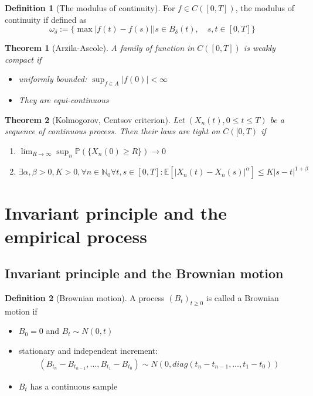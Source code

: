\documentclass[a4paper,11pt]{book}
\newtheorem{theorem}{Theorem}[section]
\theoremstyle{definition}
\newtheorem{definition}{Definition}[section]
\theoremstyle{remark}
\begin{document}
\begin{definition}[The modulus of continuity]
	For $f \in C([0, T])$, the modulus of continuity if defined as 
	\begin{equation*}
		\omega_\delta := \{ \max |f(t) - f(s)| | s \in B_\delta(t),\quad s,t \in [0, T]\}
	\end{equation*}
\end{definition}

\begin{theorem}[Arzila-Ascole] 
	A family of function in $C([0, T])$ is weakly compact if
	\begin{itemize}
		\item uniformly bounded: $\sup_{f \in A} |f(0)| < \infty$
		\item They are equi-continuous
	\end{itemize}
\end{theorem}

\begin{theorem}[Kolmogorov, Centsov criterion]
Let $(X_n(t), 0 \leq t \leq T)$ be a sequence of continuous process. Then their laws are tight on $C([0, T)$ if
\begin{enumerate}
	\item $\lim_{R \rightarrow \infty} \sup_n \mathbb{P}(\{X_n(0) \geq R\}) \rightarrow 0$ 
	\item $\exists \alpha, \beta > 0, K > 0,  \forall n \in \mathbb{N}_0 \forall t, s \in [0, T]:\mathbb{E}[|X_n(t) - X_n(s)|^\alpha] \leq K|s-t|^{1+\beta}$
\end{enumerate}
\end{theorem}

\section{Invariant principle and the empirical process}
\subsection{Invariant principle and the Brownian motion}
\begin{definition}[Brownian motion]
	A process $(B_t)_{t \geq 0}$ is called a Brownian motion if
	\begin{itemize}
		\item $B_0 = 0$ and $B_t \sim N(0, t)$
		\item stationary and independent increment:
		\begin{align*}
			(B_{t_n} - B_{t_{n-1}}, \dots, B_{t_1} - B_{t_0}) \sim N(0, diag(t_n - t_{n-1}, \dots, t_1 - t_0))
		\end{align*}
		\item $B_t$ has a continuous sample
	\end{itemize}
\end{definition}
\end{document}
